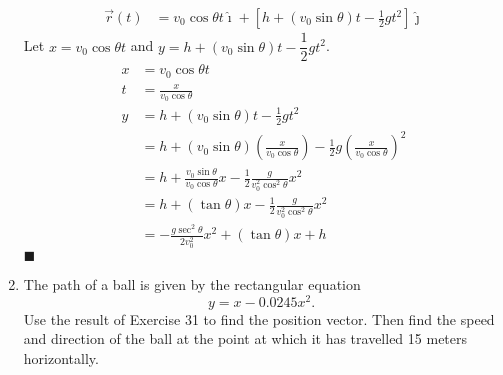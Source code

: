 \begin{enumerate}
          \sol{}
          \begin{align*}
              \vec{r}(t) & = v_0\cos\theta t\hat{\imath} + \left[h + (v_0\sin\theta) t - \frac{1}{2}gt^2\right]\hat{\jmath}
          \end{align*}
          Let $x = v_0\cos\theta t$ and $y = h + (v_0\sin\theta) t - \dfrac{1}{2}gt^2$.
          \begin{align*}
              x & = v_0\cos\theta t                                                                                               \\
              t & = \frac{x}{v_0\cos\theta}                                                                                       \\
              y & = h + (v_0\sin\theta) t - \frac{1}{2}gt^2                                                                       \\
                & = h + (v_0\sin\theta) \left(\frac{x}{v_0\cos\theta}\right) - \frac{1}{2}g\left(\frac{x}{v_0\cos\theta}\right)^2 \\
                & = h + \frac{v_0\sin\theta}{v_0\cos\theta} x - \frac{1}{2}\frac{g}{v_0^2\cos^2\theta} x^2                        \\
                & = h + (\tan\theta) x - \frac{1}{2}\frac{g}{v_0^2\cos^2\theta} x^2                                               \\
                & = -\frac{g \sec ^2 \theta}{2 v_0^2} x^2+(\tan \theta) x+h
          \end{align*} \hfill$\blacksquare$

    \item The path of a ball is given by the rectangular equation $$ y=x-0.0245 x^2 \text
              {. } $$ Use the result of Exercise 31 to find the position vector. Then find
          the speed and direction of the ball at the point at which it has travelled 15
          meters horizontally.


\end{enumerate}
